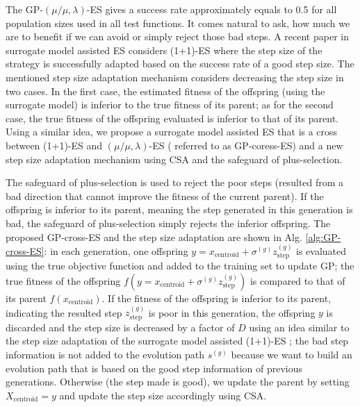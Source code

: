 The GP-$(\mu/\mu,\lambda)$-ES gives a success rate approximately equals to 0.5 for all population sizes used in all test functions. It comes natural to ask, how much we are to benefit if we can avoid or simply reject those bad steps. A recent paper in surrogate model assisted ES considers (1+1)-ES \cite{DBLP:conf/ppsn/KayhaniA18} where the step size of the strategy is successfully adapted based on the success rate of a good step size. The mentioned step size adaptation mechanism considers decreasing the step size in two cases. In the first case, the estimated fitness of the offspring (using the surrogate model) is inferior to the true fitness of its parent; as for the second case, the true fitness of the offspring evaluated is inferior to that of its parent. Using a similar idea, we propose a surrogate model assisted ES that is a cross between (1+1)-ES and $(\mu/\mu,\lambda)$-ES ( referred to as GP-coress-ES) and a new step size adaptation mechanism using CSA and the safeguard of plus-selection. 

The safeguard of plus-selection is used to reject the poor steps (resulted from a bad direction that cannot improve the fitness of the current parent). If the offspring is inferior to its parent, meaning the step generated in this generation is bad, the safeguard of plus-selection simply rejects the inferior offspring. The proposed GP-cross-ES and the step size adaptation are shown in Alg. \ref{alg:GP-cross-ES}: in each generation, one offspring $y=x_{\text{centroid}} + \sigma^{(g)} z_{\text{step}}^{(g)}$ is evaluated using the true objective function and added to the training set to update GP; the true fitness of the offspring $f(y=x_{\text{centroid}} + \sigma^{(g)} z_{\text{step}}^{(g)})$ is compared to that of its parent $f(x_{\text{centroid}})$. If the fitness of the offspring is inferior to its parent, indicating the resulted step $z_{\text{step}}^{(g)}$ is poor in this generation, the offspring $y$ is discarded and the step size is decreased by a factor of $D$ using an idea similar to the step size adaptation of the surrogate model assisted (1+1)-ES \cite{DBLP:conf/ppsn/KayhaniA18}; the bad step information is not added to the evolution path $s^{(g)}$ because we want to build an evolution path that is based on the good step information of previous generations. Otherwise (the step made is good), we update the parent by setting $X_{\text{centroid}} = y$ and update the step size accordingly using CSA. 


